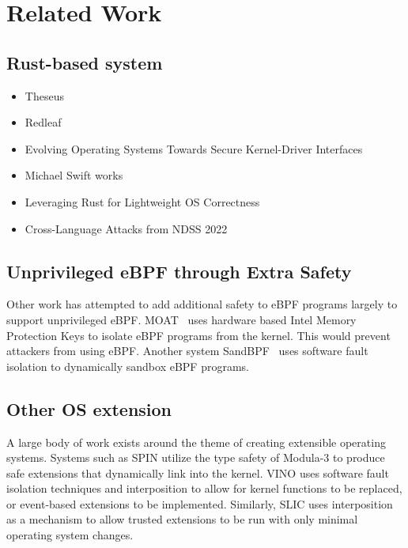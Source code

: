 \section{Related Work}
\subsection{Rust-based system}
\begin{itemize}
    \item Theseus
    \item Redleaf
    \item Evolving Operating Systems Towards Secure Kernel-Driver Interfaces
    \item Michael Swift works
    \item Leveraging Rust for Lightweight OS Correctness
    \item Cross-Language Attacks from NDSS 2022
\end{itemize}

\subsection{Unprivileged eBPF through Extra Safety}
Other work has attempted to add additional safety to eBPF programs largely
    to support unprivileged eBPF.
MOAT~\cite{lu2023moat} uses hardware based Intel Memory Protection Keys
    to isolate eBPF programs from the kernel.
This would prevent attackers from using eBPF.
Another system SandBPF~\cite{sandbpf} uses software fault isolation to dynamically
    sandbox eBPF programs.

\subsection{Other OS extension}
A large body of work exists around the theme of creating extensible operating systems.
Systems such as SPIN \cite{spin} utilize the type safety of Modula-3 to produce safe extensions that dynamically link into the kernel.
VINO \cite{vino} uses software fault isolation techniques and interposition to allow for kernel functions to be replaced, or event-based extensions to be implemented.
Similarly, SLIC \cite{slic} uses interposition as a mechanism to allow trusted extensions to be run with only minimal operating system changes.
